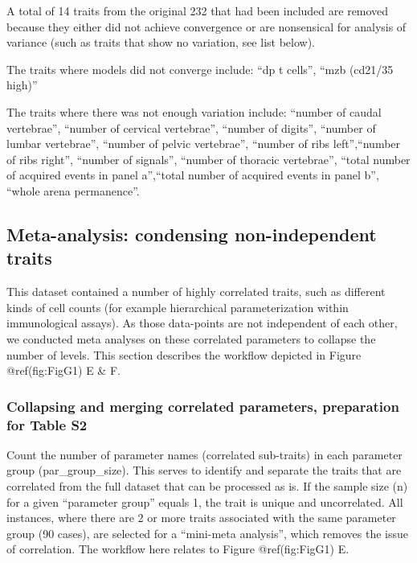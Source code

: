 \documentclass[]{article}
\begin{document}
A total of 14 traits from the original 232 that had been included are
removed because they either did not achieve convergence or are
nonsensical for analysis of variance (such as traits that show no
variation, see list below).

The traits where models did not converge include: ``dp t cells'', ``mzb
(cd21/35 high)''

The traits where there was not enough variation include: ``number of
caudal vertebrae'', ``number of cervical vertebrae'', ``number of
digits'', ``number of lumbar vertebrae'', ``number of pelvic
vertebrae'', ``number of ribs left'',``number of ribs right'', ``number
of signals'', ``number of thoracic vertebrae'', ``total number of
acquired events in panel a'',``total number of acquired events in panel
b'', ``whole arena permanence''.

\hypertarget{meta-analysis-condensing-non-independent-traits}{%
\subsection{Meta-analysis: condensing non-independent
traits}\label{meta-analysis-condensing-non-independent-traits}}

This dataset contained a number of highly correlated traits, such as
different kinds of cell counts (for example hierarchical
parameterization within immunological assays). As those data-points are
not independent of each other, we conducted meta analyses on these
correlated parameters to collapse the number of levels. This section
describes the workflow depicted in Figure @ref(fig:FigG1) E \& F.

\hypertarget{collapsing-and-merging-correlated-parameters-preparation-for-table-s2}{%
\subsubsection{Collapsing and merging correlated parameters, preparation
for Table
S2}\label{collapsing-and-merging-correlated-parameters-preparation-for-table-s2}}

Count the number of parameter names (correlated sub-traits) in each
parameter group (par\_group\_size). This serves to identify and separate
the traits that are correlated from the full dataset that can be
processed as is. If the sample size (n) for a given ``parameter group''
equals 1, the trait is unique and uncorrelated. All instances, where
there are 2 or more traits associated with the same parameter group (90
cases), are selected for a ``mini-meta analysis'', which removes the
issue of correlation. The workflow here relates to Figure
@ref(fig:FigG1) E.
\end{document}
